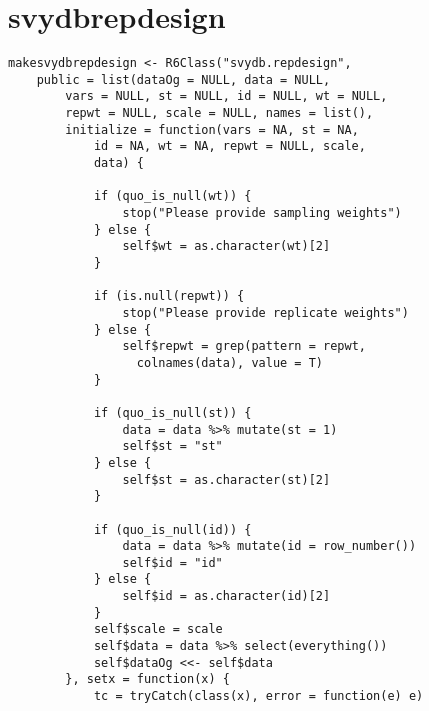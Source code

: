 \section{svydbrepdesign}

\begin{lstlisting}
makesvydbrepdesign <- R6Class("svydb.repdesign", 
    public = list(dataOg = NULL, data = NULL, 
        vars = NULL, st = NULL, id = NULL, wt = NULL, 
        repwt = NULL, scale = NULL, names = list(), 
        initialize = function(vars = NA, st = NA, 
            id = NA, wt = NA, repwt = NULL, scale, 
            data) {
            
            if (quo_is_null(wt)) {
                stop("Please provide sampling weights")
            } else {
                self$wt = as.character(wt)[2]
            }
            
            if (is.null(repwt)) {
                stop("Please provide replicate weights")
            } else {
                self$repwt = grep(pattern = repwt, 
                  colnames(data), value = T)
            }
            
            if (quo_is_null(st)) {
                data = data %>% mutate(st = 1)
                self$st = "st"
            } else {
                self$st = as.character(st)[2]
            }
            
            if (quo_is_null(id)) {
                data = data %>% mutate(id = row_number())
                self$id = "id"
            } else {
                self$id = as.character(id)[2]
            }
            self$scale = scale
            self$data = data %>% select(everything())
            self$dataOg <<- self$data
        }, setx = function(x) {
            tc = tryCatch(class(x), error = function(e) e)
            

\end{lstlisting}
